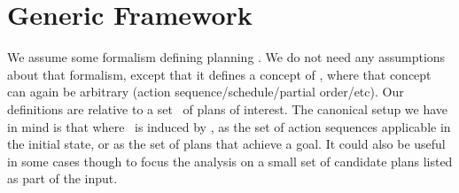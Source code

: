 \section{Generic Framework}
\label{framework}

%

We assume some formalism defining planning  \task. We
do not need any assumptions about that formalism, except that it
defines a concept of  \plan, where that concept can
again be arbitrary (action sequence/schedule/partial order/etc). 
%
Our definitions are relative to a set \plans\ of plans of
interest. The canonical setup we have in mind is that where \plans\ is
induced by \task, as the set of action sequences applicable in the
initial state, or as the set of plans that achieve a goal. It could
also be useful in some cases though to focus the analysis on a small
set of candidate plans listed as part of the input.


%


